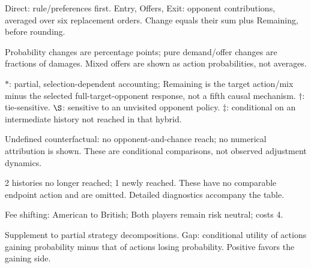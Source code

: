 \documentclass[10pt]{article}
\begin{document}
{\footnotesize Direct: rule/preferences first. Entry, Offers, Exit: opponent contributions, averaged over six replacement orders. Change equals their sum plus Remaining, before rounding.\par
Probability changes are percentage points; pure demand/offer changes are fractions of damages. Mixed offers are shown as action probabilities, not averages.\par
$*$: partial, selection-dependent accounting; Remaining is the target action/mix minus the selected full-target-opponent response, not a fifth causal mechanism. $\dagger$: tie-sensitive. $\S$: sensitive to an unvisited opponent policy. $\ddagger$: conditional on an intermediate history not reached in that hybrid.\par
Undefined counterfactual: no opponent-and-chance reach; no numerical attribution is shown. These are conditional comparisons, not observed adjustment dynamics.\par
2 histories no longer reached; 1 newly reached. These have no comparable endpoint action and are omitted. Detailed diagnostics accompany the table.}\par
{}\par
Fee shifting: American to British; Both players remain risk neutral; costs 4.\par
{\small Supplement to partial strategy decompositions. Gap: conditional utility of actions gaining probability minus that of actions losing probability. Positive favors the gaining side.}\par
\end{document}
